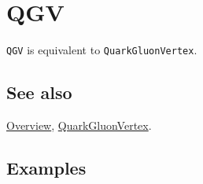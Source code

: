 \documentclass[../FeynCalcManual.tex]{subfiles}
\begin{document}
\hypertarget{qgv}{
\section{QGV}\label{qgv}}

\texttt{QGV} is equivalent to \texttt{QuarkGluonVertex}.

\subsection{See also}

\hyperlink{toc}{Overview},
\hyperlink{quarkgluonvertex}{QuarkGluonVertex}.

\subsection{Examples}
\end{document}
